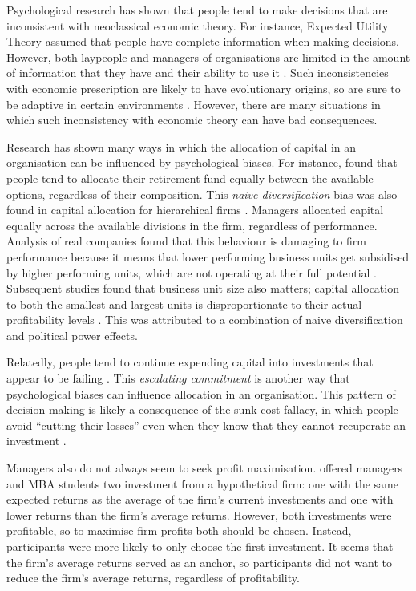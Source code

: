 \documentclass[a4paper, nobind, dvipsnames]{templates/ociamthesis}
\theoremstyle{definition}
\theoremstyle{definition}
\theoremstyle{definition}
\theoremstyle{definition}
\theoremstyle{remark}
\begin{document}
Psychological research has shown that people tend to make decisions that are
inconsistent with neoclassical economic theory. For instance, Expected Utility
Theory \autocites[EUT;][]{friedman1948,vonneumann1944} assumed that people have complete
information when making decisions. However, both laypeople and managers of
organisations are limited in the amount of information that they have and their
ability to use it \autocite{simon1955,cyert1956}. Such inconsistencies with economic
prescription are likely to have evolutionary origins, so are sure to be adaptive
in certain environments \autocite{haselton2009,gigerenzer2008,bettis2017}. However,
there are many situations in which such inconsistency with economic theory can
have bad consequences.

Research has shown many ways in which the allocation of capital in an
organisation can be influenced by psychological biases. For instance,
\textcite{benartzi2001} found that people tend to allocate their retirement fund equally
between the available options, regardless of their composition. This \emph{naive
diversification} bias was also found in capital allocation for hierarchical
firms \autocite{bardolet2011}. Managers allocated capital equally across the available
divisions in the firm, regardless of performance. Analysis of real companies
found that this behaviour is damaging to firm performance because it means that
lower performing business units get subsidised by higher performing units, which
are not operating at their full potential \autocite{arrfelt2015,bardolet2010}.
Subsequent studies found that business unit size also matters; capital
allocation to both the smallest and largest units is disproportionate to their
actual profitability levels \autocite{bardolet2017}. This was attributed to a
combination of naive diversification and political power effects.

Relatedly, people tend to continue expending capital into investments that
appear to be failing \autocite{staw1981}. This \emph{escalating commitment} is another way
that psychological biases can influence allocation in an organisation. This
pattern of decision-making is likely a consequence of the sunk cost fallacy, in
which people avoid ``cutting their losses'' even when they know that they cannot
recuperate an investment \autocite{parayre1995}.

Managers also do not always seem to seek profit maximisation. \textcite{shapira2014}
offered managers and MBA students two investment from a hypothetical firm: one
with the same expected returns as the average of the firm's current investments
and one with lower returns than the firm's average returns. However, both
investments were profitable, so to maximise firm profits both should be chosen.
Instead, participants were more likely to only choose the first investment. It
seems that the firm's average returns served as an anchor, so participants did
not want to reduce the firm's average returns, regardless of profitability.
\end{document}
